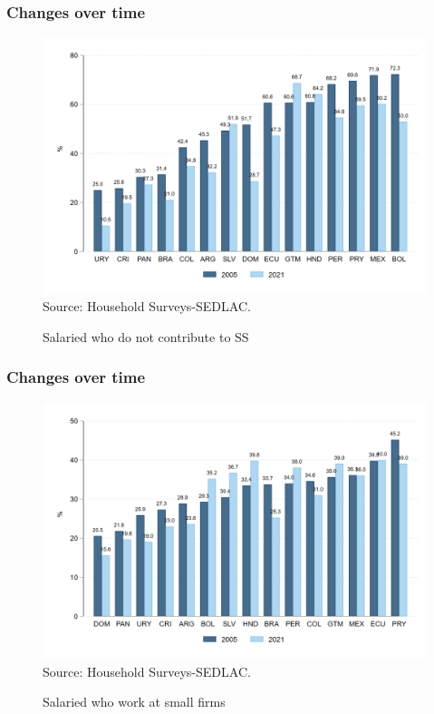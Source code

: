 \documentclass{beamer}
\begin{document}
\begin{frame}
\frametitle{Changes over time}
\begin{figure}[!htb]
    \justifying
     \caption{Salaried who do not contribute to SS}     
       \includegraphics[width=0.8\linewidth]
       {latex/figures/Snapshot/snapshot_informal_ss_dep.png}
    \label{fig:SalariedSS}
    \centering
    \footnotesize{Source: Household Surveys-SEDLAC.}
\end{figure}


    
\end{frame}


\begin{frame}
\frametitle{Changes over time}
\begin{figure}[!htb]
    \justifying
     \caption{Salaried who work at small firms}     
     \includegraphics[width=0.8\linewidth]{latex/figures/Snapshot/snapshot_dependents_small.png}
    \label{fig:SalariedSmall}
    \centering
    \footnotesize{Source: Household Surveys-SEDLAC.}
\end{figure}
\end{frame}
\end{document}
